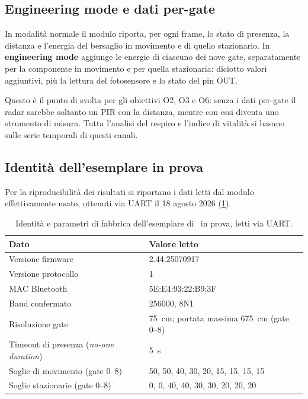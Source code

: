 \subsection{Engineering mode e dati per-gate}
\label{sec:engineering}

In modalità normale il modulo riporta, per ogni frame, lo stato di presenza, la
distanza e l'energia del bersaglio in movimento e di quello stazionario. In
\textbf{engineering mode} aggiunge le energie di ciascuno dei nove gate,
separatamente per la componente in movimento e per quella stazionaria: diciotto
valori aggiuntivi, più la lettura del fotosensore e lo stato del pin OUT.

Questo è il punto di svolta per gli obiettivi O2, O3 e O6: senza i dati per-gate
il radar sarebbe soltanto un PIR con la distanza, mentre con essi diventa uno
strumento di misura. Tutta l'analisi del respiro e l'indice di vitalità si basano
sulle serie temporali di questi canali.

\subsection{Identità dell'esemplare in prova}
\label{sec:identita}

Per la riproducibilità dei risultati si riportano i dati letti dal modulo
effettivamente usato, ottenuti via UART il 18 agosto 2026
(\cref{tab:identita}).

\begin{table}[htbp]
\centering
\caption{Identità e parametri di fabbrica dell'esemplare di \ldb\ in prova, letti
via UART.}
\label{tab:identita}
\small
\begin{tabular}{@{}ll@{}}
\toprule
\textbf{Dato} & \textbf{Valore letto} \\
\midrule
Versione firmware & 2.44.25070917 \\
Versione protocollo & 1 \\
MAC Bluetooth & 5E:E4:93:22:B9:3F \\
Baud confermato & 256000, 8N1 \\
Risoluzione gate & 75~cm; portata massima 675~cm (gate 0--8) \\
Timeout di presenza (\emph{no-one duration}) & 5~s \\
Soglie di movimento (gate 0--8) & 50, 50, 40, 30, 20, 15, 15, 15, 15 \\
Soglie stazionarie (gate 0--8) & 0, 0, 40, 40, 30, 30, 20, 20, 20 \\
\bottomrule
\end{tabular}
\end{table}

